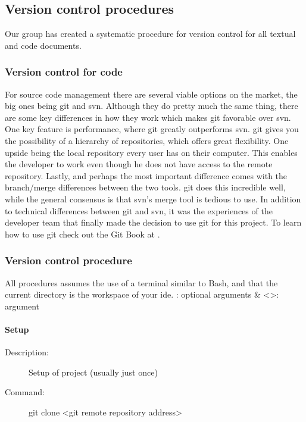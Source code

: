 

\subsection{Version control procedures}
Our group has created a systematic procedure for version control for all textual  and code documents. 

\subsubsection{Version control for code}
For source code management there are several viable options on the market, the big ones being \gls{git} and \gls{svn}. Although they do pretty much the same thing, there are some key differences in how they work which makes \gls{git} favorable over \gls{svn}. One key feature is performance, where \gls{git} greatly outperforms \gls{svn}. \gls{git} gives you the possibility of a hierarchy of repositories, which offers great flexibility. One upside being the local repository every user has on their computer. This enables the developer to work even though he does not have access to the remote repository. Lastly, and perhaps the most important difference comes with the branch/merge differences between the two tools. \gls{git} does this incredible well, while the general consensus is that \gls{svn}’s merge tool is tedious to use.  
\newline
\newline
In addition to technical differences between \gls{git} and \gls{svn}, it was the experiences of the developer team that finally made the decision to use \gls{git} for this project. To learn how to use \gls{git} check out the Git Book at \cite{bib:gitbook}.

\subsubsection{Version control procedure}
All procedures assumes the use of a terminal similar to Bash, and that the current directory is the workspace of your \gls{ide}.
\newline
\newline
[]: optional arguments \& <>: argument

\paragraph{Setup}
\begin{description}
\item[Description:] Setup of project (usually just once)
\item[Command:] git clone <git remote repository address>
\end{description}

